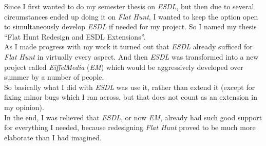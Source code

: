 Since I first wanted to do my semester thesis on \emph{ESDL}, but then due to several circumstances ended up doing it on \emph{Flat Hunt}, I wanted to keep the option open to simultaneously develop \emph{ESDL} if needed for my project. So I named my thesis ``Flat Hunt Redesign and ESDL Extensions''.\\ 
As I made progress with my work it turned out that \emph{ESDL} already sufficed for \emph{Flat Hunt} in virtually every aspect. And then \emph{ESDL} was transformed into a new project called \emph{EiffelMedia} (\emph{EM}) which would be aggressively developed over summer by a number of people. \\
So basically what I did with \emph{ESDL} was use it, rather than extend it (except for fixing minor bugs which I ran across, but that does not count as an extension in my opinion).\\
In the end, I was relieved that \emph{ESDL}, or now \emph{EM}, already had such good support for everything I needed, because redesigning \emph{Flat Hunt} proved to be much more elaborate than I had imagined.
